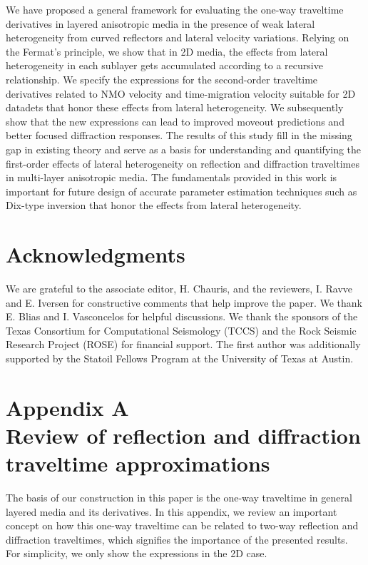 We have proposed a general framework for evaluating the one-way traveltime derivatives in layered anisotropic media in the presence of weak lateral heterogeneity from curved reflectors and lateral velocity variations. Relying on the Fermat's principle, we show that in 2D media, the effects from lateral heterogeneity in each sublayer gets accumulated according to a recursive relationship. We specify the expressions for the second-order traveltime derivatives related to NMO velocity and time-migration velocity suitable for 2D datadets that honor these effects from lateral heterogeneity. We subsequently show that the new expressions can lead to improved moveout predictions and better focused diffraction responses. The results of this study fill in the missing gap in existing theory and serve as a basis for understanding and quantifying the first-order effects of lateral heterogeneity on reflection and diffraction traveltimes in multi-layer anisotropic media. The fundamentals provided in this work is important for future design of accurate parameter estimation techniques such as Dix-type inversion that honor the effects from lateral heterogeneity. 

\section{Acknowledgments}
We are grateful to the associate editor, H. Chauris, and the reviewers, I. Ravve and E. Iversen for constructive comments that help improve the paper. We thank E. Blias and I. Vasconcelos for helpful discussions. We thank the sponsors of the Texas Consortium for Computational Seismology (TCCS) and the Rock Seismic Research Project (ROSE) for financial support. The first author was additionally supported by the Statoil Fellows Program at the University of Texas at Austin.

\clearpage
\section{Appendix A \\ Review of reflection and diffraction traveltime approximations}
The basis of our construction in this paper is the one-way traveltime in general layered media and its derivatives. In this appendix, we review an important concept on how this one-way traveltime can be related to two-way reflection and diffraction traveltimes, which signifies the importance of the presented results. For simplicity, we only show the expressions in the 2D case.

